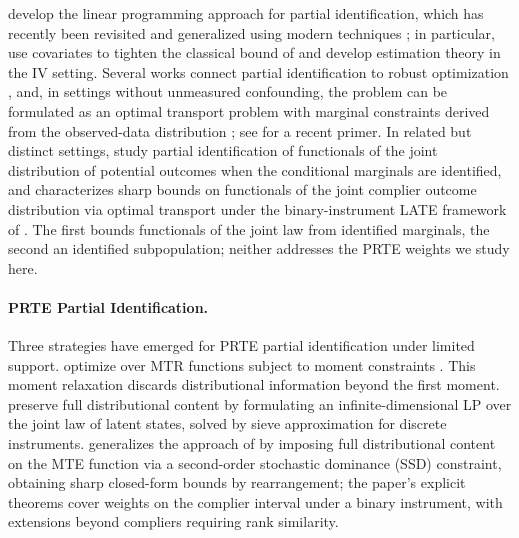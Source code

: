 \citet{balke_pearl1997bounds} develop the linear programming approach for partial identification, which has recently been revisited and generalized using modern techniques \citep{balazadeh_meresht_syrgkanis_krishnan2022,guo_yin_wang_jordan2022,duarte2024automated,levis2025covariate}; in particular, \citet{levis2025covariate} use covariates to tighten the classical bound of \citet{balke_pearl1997bounds} and develop estimation theory in the IV setting. Several works connect partial identification to robust optimization \citep{guo_yin_wang_jordan2022,balazadeh_meresht_syrgkanis_krishnan2022,fan_pass_shi2025,tan2024consistency}, and, in settings without unmeasured confounding, the problem can be formulated as an optimal transport problem with marginal constraints derived from the observed-data distribution \citep{ji_lei_spector2024,lin2025estimation,lin2025tightening}; see \citet{gunsilius2025primer} for a recent primer. In related but distinct settings, \citet{fan_guerre_zhu2017partial} study partial identification of functionals of the joint distribution of potential outcomes when the conditional marginals are identified, and \citet{oberreynolds2023estimating} characterizes sharp bounds on functionals of the joint complier outcome distribution via optimal transport under the binary-instrument LATE framework of \citet{angrist1995identification}. The first bounds functionals of the joint law from identified marginals, the second an identified subpopulation; neither addresses the PRTE weights we study here.

\paragraph{PRTE Partial Identification.} Three strategies have emerged for PRTE partial identification under limited support. \citet{magne2018using} optimize over MTR functions subject to moment constraints \citep{mogstad2018identification}. This moment relaxation discards distributional information beyond the first moment. \citet{han_yang2024computational} preserve full distributional content by formulating an infinite-dimensional LP over the joint law of latent states, solved by sieve approximation for discrete instruments. \citet{marx2024sharp} generalizes the approach of \citet{magne2018using} by imposing full distributional content on the MTE function via a second-order stochastic dominance (SSD) constraint, obtaining sharp closed-form bounds by rearrangement; the paper's explicit theorems cover weights on the complier interval under a binary instrument, with extensions beyond compliers requiring rank similarity.

